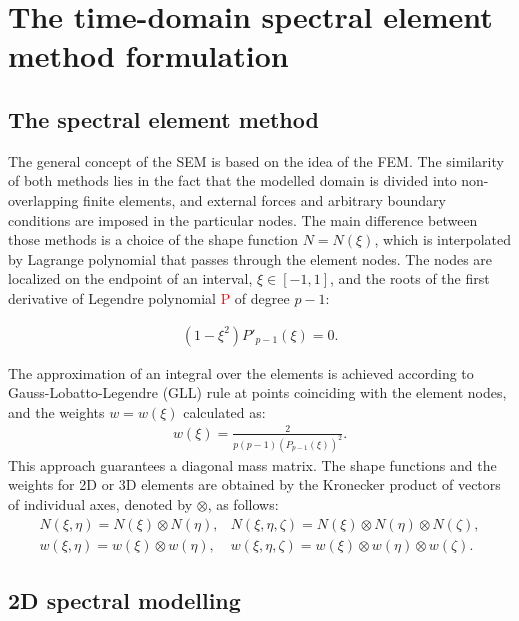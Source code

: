 \documentclass[sensors,article,submit,moreauthors,pdftex]{Definitions/mdpi}
\begin{document}
\section{The time-domain spectral element method formulation}
\label{sec:time_SEM}
\subsection{The spectral element method}
\label{sec:sem}
The general concept of the SEM is based on the idea of the FEM.
The similarity of both methods lies in the fact that the modelled domain is divided into non-overlapping finite elements, and external forces and arbitrary boundary conditions are imposed in the particular nodes.
The main difference between those methods is a choice of the shape function \( N=N(\xi )\), which is interpolated by Lagrange polynomial that passes through the element nodes.
The nodes are localized on the endpoint of an interval, \(\xi\in[-1,1]\), and the roots of the first derivative of Legendre polynomial \textcolor{red}{P} of degree \(p-1\):

\begin{eqnarray}
(1-\xi^2)P'_{p-1}(\xi)=0.
\label{eq:nodes}
\end{eqnarray}

The approximation of an integral over the elements is achieved according to Gauss-Lobatto-Legendre (GLL) rule at points coinciding with the element nodes, 
and the weights \(w=w(\xi)\) calculated as:
\begin{eqnarray}
{w(\xi)} = \frac{2}{p(p-1)(P_{p-1}(\xi))^2}.
\label{eq:weights}
\end{eqnarray}
This approach guarantees a diagonal mass matrix.
The shape functions and the weights for 2D or 3D elements are obtained by the Kronecker product of vectors of individual axes, denoted by \(\otimes\), as follows:
\begin{eqnarray}
N(\xi,\eta) = N(\xi)\otimes N(\eta), & N(\xi,\eta,\zeta) = N(\xi)\otimes N(\eta)\otimes N(\zeta), \nonumber\\
w(\xi,\eta) = w(\xi)\otimes w(\eta), & w(\xi,\eta,\zeta) = w(\xi)\otimes w(\eta)\otimes w(\zeta).
\label{eq:3Dshape_weights}
\end{eqnarray}
\subsection{2D spectral modelling}
\label{sec:2D_SEM}
\end{document}
